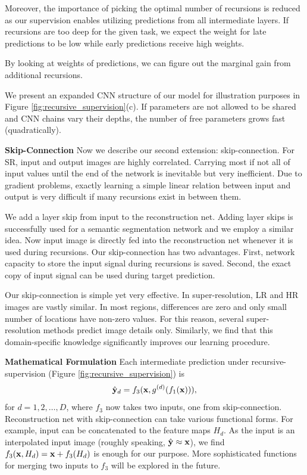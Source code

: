 \documentclass[10pt,twocolumn,letterpaper]{article}
\begin{document}
Moreover, the importance of picking the optimal number of recursions is reduced as our supervision enables utilizing predictions from all intermediate layers. If recursions are too deep for the given task, we expect the weight for late predictions to be low while early predictions receive high weights. 


By looking at weights of predictions, we can figure out the marginal gain from additional recursions. 

We present an expanded CNN structure of our model for illustration purposes in Figure \ref{fig:recursive_supervision}(c). If parameters are not allowed to be shared and CNN chains vary their depths, the number of free parameters grows fast (quadratically).

\textbf{Skip-Connection} Now we describe our second extension: skip-connection. For SR, input and output images are highly correlated. Carrying most if not all of input values until the end of the network is inevitable but very inefficient. Due to gradient problems, exactly learning a simple linear relation between input and output is very difficult if many recursions exist in between them.  

We add a layer skip \cite{bishop2006pattern} from input to the reconstruction net. Adding layer skips is successfully used for a semantic segmentation network \cite{long2014fully} and we employ a similar idea. Now input image is directly fed into the reconstruction net whenever it is used during recursions. Our skip-connection has two advantages. First, network capacity to store the input signal during recursions is saved. Second, the exact copy of input signal can be used during target prediction. 

Our skip-connection is simple yet very effective. In super-resolution, LR and HR images are vastly similar. In most regions, differences are zero and only small number of locations have non-zero values. For this reason, several super-resolution methods \cite{Timofte2013, Timofte, bevilacqua2012,bevilacqua2013super} predict image details only. Similarly, we find that this domain-specific knowledge significantly improves our learning procedure. 

\textbf{Mathematical Formulation} Each intermediate prediction under recursive-supervision (Figure \ref{fig:recursive_supervision}) is 
\begin{equation}
\hat{{\bf y}}_{d} = f_3({\bf x}, g^{(d)}(f_1({\bf x}))),
\end{equation}
for $d=1,2,\dots,D$, where $f_3$ now takes two inputs, one from skip-connection. Reconstruction net with skip-connection can take various functional forms. For example, input can be concatenated to the feature maps $H_d$. As the input is an interpolated input image (roughly speaking, $\hat{\bf y} \approx {\bf x}$), we find $f_3({\bf x}, H_d) = {\bf x} + f_3(H_d)$ is enough for our purpose. More sophisticated functions for merging two inputs to $f_3$ will be explored in the future. 
\end{document}
